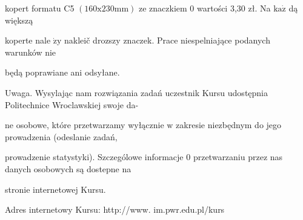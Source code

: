 \documentclass[a4paper,12pt]{article}
\begin{document}
kopert formatu C5 $(160\mathrm{x}230\mathrm{m}\mathrm{m})$ ze znaczkiem $0$ wartości 3,30 zł. Na $\mathrm{k}\mathrm{a}\dot{\mathrm{z}}$ dą większą

koperte nale $\dot{\mathrm{z}}\mathrm{y}$ nakleič drozszy znaczek. Prace niespelniające podanych warunków nie

będą poprawiane ani odsyłane.

Uwaga. Wysylając nam rozwiązania zadań uczestnik Kursu udostępnia Politechnice Wroclawskiej swoje da-

ne osobowe, które przetwarzamy wyłącznie $\mathrm{w}$ zakresie niezbędnym do jego prowadzenia (odeslanie zadań,

prowadzenie statystyki). Szczególowe informacje $0$ przetwarzaniu przez nas danych osobowych są dostepne na

stronie internetowej Kursu.

Adres internetowy Kursu: http://www. im.pwr.edu.pl/kurs
\end{document}
